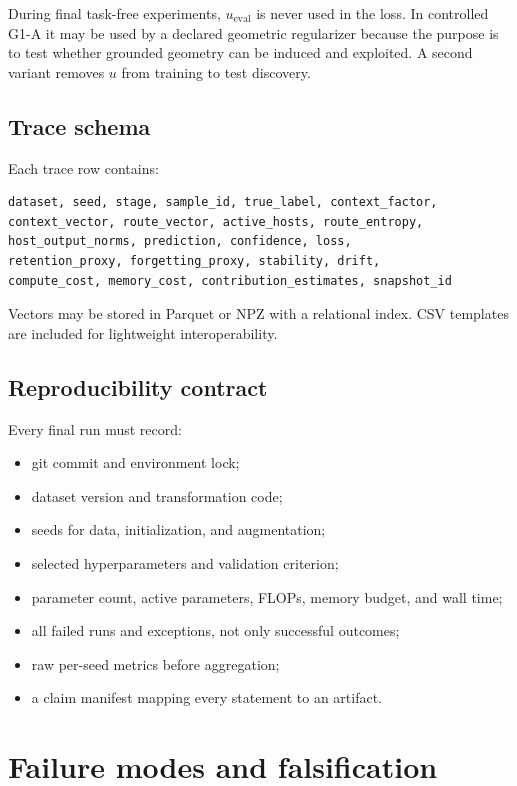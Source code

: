 \documentclass[11pt,a4paper]{article}
\begin{document}
During final task-free experiments, \(u_{\mathrm{eval}}\) is never used in the loss. In controlled G1-A it may be used by a declared geometric regularizer because the purpose is to test whether grounded geometry can be induced and exploited. A second variant removes \(u\) from training to test discovery.

\subsection{Trace schema}

Each trace row contains:

\begin{lstlisting}
dataset, seed, stage, sample_id, true_label, context_factor,
context_vector, route_vector, active_hosts, route_entropy,
host_output_norms, prediction, confidence, loss,
retention_proxy, forgetting_proxy, stability, drift,
compute_cost, memory_cost, contribution_estimates, snapshot_id
\end{lstlisting}

Vectors may be stored in Parquet or NPZ with a relational index. CSV templates are included for lightweight interoperability.

\subsection{Reproducibility contract}

Every final run must record:

\begin{itemize}
\item git commit and environment lock;
\item dataset version and transformation code;
\item seeds for data, initialization, and augmentation;
\item selected hyperparameters and validation criterion;
\item parameter count, active parameters, FLOPs, memory budget, and wall time;
\item all failed runs and exceptions, not only successful outcomes;
\item raw per-seed metrics before aggregation;
\item a claim manifest mapping every statement to an artifact.
\end{itemize}

\section{Failure modes and falsification}
\end{document}

